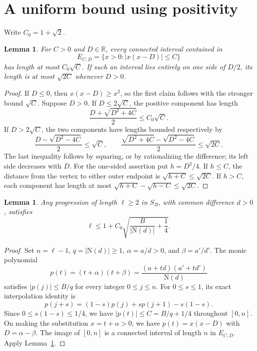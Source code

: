 \documentclass[11pt]{article}
\newtheorem{lemma}[theorem]{Lemma}
\newcommand{\R}{\mathbb R}
\newcommand{\N}{\mathrm N}
\begin{document}
\section{A uniform bound using positivity}
Write $C_0=1+\sqrt2$.
\begin{lemma}\label{lem:geometry}
For $C>0$ and $D\in\R$, every connected interval contained in
\[
 E_{C,D}=\{x>0:|x(x-D)|\le C\}
\]
has length at most $C_0\sqrt C$. If such an interval lies entirely on one side of $D/2$, its length is at most $\sqrt{2C}$ whenever $D>0$.
\end{lemma}
\begin{proof}
If $D\le0$, then $x(x-D)\ge x^2$, so the first claim follows with the stronger bound $\sqrt C$. Suppose $D>0$. If $D\le2\sqrt C$, the positive component has length
\[
 \frac{D+\sqrt{D^2+4C}}2\le C_0\sqrt C.
\]
If $D>2\sqrt C$, the two components have lengths bounded respectively by
\[
 \frac{D-\sqrt{D^2-4C}}2\le\sqrt C,
 \qquad
 \frac{\sqrt{D^2+4C}-\sqrt{D^2-4C}}2\le\sqrt{2C}.
\]
The last inequality follows by squaring, or by rationalizing the difference; its left side decreases with $D$.
For the one-sided assertion put $h=D^2/4$. If $h\le C$, the distance from the vertex to either outer endpoint is $\sqrt{h+C}\le\sqrt{2C}$. If $h>C$, each component has length at most $\sqrt{h+C}-\sqrt{h-C}\le\sqrt{2C}$.
\end{proof}

\begin{lemma}\label{lem:universal}
Any progression of length $\ell\ge2$ in $S_B$, with common difference $d>0$, satisfies
\begin{equation}\label{eq:bound}
 \ell\le1+C_0\sqrt{\frac B{|\N(d)|}+\frac14}.
\end{equation}
\end{lemma}
\begin{proof}
Set $n=\ell-1$, $q=|\N(d)|\ge1$, $\alpha=a/d>0$, and $\beta=a'/d'$. The monic polynomial
\[
 p(t)=(t+\alpha)(t+\beta)=\frac{(a+td)(a'+td')}{\N(d)}
\]
satisfies $|p(j)|\le B/q$ for every integer $0\le j\le n$. For $0\le s\le1$, its exact interpolation identity is
\[
 p(j+s)=(1-s)p(j)+sp(j+1)-s(1-s).
\]
Since $0\le s(1-s)\le1/4$, we have $|p(t)|\le C=B/q+1/4$ throughout $[0,n]$. On making the substitution $x=t+\alpha>0$, we have $p(t)=x(x-D)$ with $D=\alpha-\beta$. The image of $[0,n]$ is a connected interval of length $n$ in $E_{C,D}$. Apply Lemma~\ref{lem:geometry}.
\end{proof}
\end{document}
